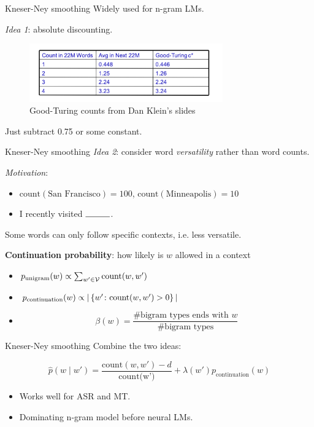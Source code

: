 \documentclass[usenames,dvipsnames,notes]{beamer}
\begin{document}
\begin{frame}
    {Kneser-Ney smoothing}
    Widely used for n-gram LMs.

    \emph{Idea 1}: absolute discounting.
    \begin{figure}
        \includegraphics[height=2.5cm]{figures/good-turing}
        \caption{Good-Turing counts from Dan Klein's slides}
    \end{figure}

    Just subtract 0.75 or some constant.
\end{frame}

\begin{frame}
    {Kneser-Ney smoothing}
    \emph{Idea 2}: consider word \emph{versatility} rather than word counts.

    \emph{Motivation}:\\
    \begin{itemize}
        \item[] $\text{count}(\text{San Francisco})=100$, $\text{count}(\text{Minneapolis})=10$
        \item[] I recently visited $\rule{1cm}{0.15mm}$.
    \end{itemize}
    \pause
    Some words can only follow specific contexts, i.e. less versatile.

    \textbf{Continuation probability}: how likely is $w$ allowed in a context\\
    \begin{itemize}
        \item[] $p_{\text{unigram}}(w) \propto \sum_{w'\in\mathcal{V}}\text{count}(w, w')$
        \item[] $p_{\text{continuation}}(w) \propto |\left\{ w'\colon \text{count}(w, w') > 0 \right\}|$
        \item[] $$\beta(w) = \frac{\text{\# bigram types ends with $w$}}{\text{\# bigram types}}$$
    \end{itemize}
\end{frame}

\begin{frame}
    {Kneser-Ney smoothing}
    Combine the two ideas:

    $$
    \hat{p}(w\mid w') = \frac{\text{count}(w, w') - d}{\text{count(w')}} + \lambda(w')p_{\text{continuation}}(w)
    $$
    \vspace{2em}

    \begin{itemize}
        \item Works well for ASR and MT.
        \item Dominating n-gram model before neural LMs.
    \end{itemize}
\end{frame}
\end{document}
